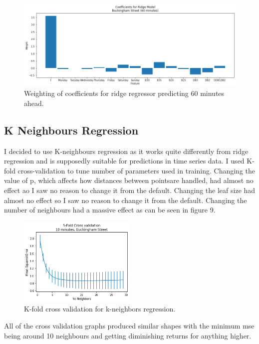 \begin{figure}[H]
    \centering
    \includegraphics[width=1\textwidth]{images/coefficients5.png}
    \caption{Weighting of coefficients for ridge regressor predicting 60 minutes ahead.}
    \end{figure}
\par 


\subsection{K Neighbours Regression}

I decided to use K-neighbours regression as it works quite differently from ridge regression and is supposedly suitable for predictions in time series data.
I used K-fold cross-validation to tune number of parameters used in training.
Changing the value of p, which affects how distances between pointsare handled, had almost no effect ao I saw no reason to change it from the default.
Changing the leaf size had almost no effect so I saw no reason to change it from the default.
Changing the number of neighbours had a massive effect as can be seen in figure 9.

\begin{figure}[H]
    \centering
    \includegraphics[width=0.5\textwidth]{images/neighbors_kfold1.png}
    \caption{K-fold cross validation for k-neighbors regression.}
    \end{figure}
\par 

All of the cross validation graphs produced similar shapes with the minimum mse being around 10 neighbours and getting diminishing returns for anything higher.

